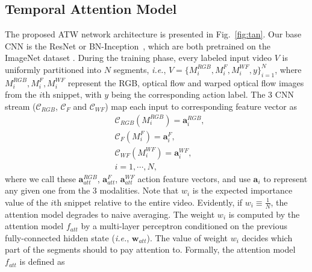 \documentclass[runningheads,a4paper]{llncs}
\begin{document}
\subsection{Temporal Attention Model}
The proposed ATW network architecture is presented in Fig.~\ref{fig:tan}. Our base CNN is the ResNet \cite{he2016deep}
or BN-Inception~\cite{ioffe2015batch}, which are both pretrained on the ImageNet dataset \cite{deng2009imagenet}. During
the training phase, every labeled input video $V$ is uniformly partitioned into $N$ segments, {\em i.e.},
$V=\{M_i^{RGB}, M_i^{F}, M_i^{WF}, y\}_{i=1}^N$, where $M_i^{RGB}, M_i^{F}, M_i^{WF}$ represent the RGB, optical flow and
warped optical flow images from the $i$th snippet, with $y$ being the corresponding action label. The $3$ CNN stream
($\mathcal{C}_{RGB}$, $\mathcal{C}_F$ and $\mathcal{C}_{WF}$) map each input to corresponding feature vector as
\begin{equation}
\begin{split}
&\mathcal{C}_{RGB}(M_i^{RGB}) = \mathbf{a}_i^{RGB}, \\
&\mathcal{C}_{F}(M_i^{F}) = \mathbf{a}_i^{F}, \\
&\mathcal{C}_{WF}(M_i^{WF}) =  \mathbf{a}_i^{WF}, \\
&i = 1, \cdots, N,
\end{split}
\end{equation}
where we call these $\mathbf{a}_{att}^{RGB}$, $\mathbf{a}_{att}^{F}$, $\mathbf{a}_{att}^{WF}$ action feature
vectors, and use $\mathbf{a}_i$ to represent any given one from the 3 modalities. Note that $w_i$ is the expected importance
value of the $i$th snippet relative to the entire video. Evidently, if $w_i \equiv \frac{1}{N}$, the attention model degrades
to naive averaging. The weight $w_i$ is computed by the attention model $f_{att}$ by a multi-layer perceptron conditioned on
the previous fully-connected hidden state ({\em i.e.}, $\mathbf{w}_{att}$). The value of weight $w_i$ decides which part of the
segments should to pay attention to. Formally, the attention model $f_{att}$ is defined as
\end{document}

